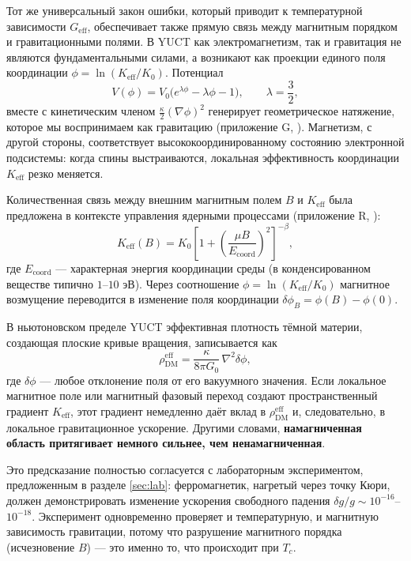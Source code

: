 \documentclass[12pt]{article}
\theoremstyle{remark}
\newcommand{\Keff}{K_{\mathrm{eff}}}
\begin{document}
	Тот же универсальный закон ошибки, который приводит к температурной зависимости $G_{\mathrm{eff}}$, обеспечивает также прямую связь между магнитным порядком и гравитационными полями. В YUCT как электромагнетизм, так и гравитация не являются фундаментальными силами, а возникают как проекции единого поля координации $\phi = \ln(\Keff/K_0)$. Потенциал
	\begin{equation}
		V(\phi) = V_0\bigl(e^{\lambda\phi} - \lambda\phi - 1\bigr), \qquad \lambda = \frac{3}{2},
	\end{equation}
	вместе с кинетическим членом $\frac{\kappa}{2}(\nabla\phi)^2$ генерирует геометрическое натяжение, которое мы воспринимаем как гравитацию (приложение G, \cite{AppendixG}). Магнетизм, с другой стороны, соответствует высококоординированному состоянию электронной подсистемы: когда спины выстраиваются, локальная эффективность координации $\Keff$ резко меняется.
	
	Количественная связь между внешним магнитным полем $B$ и $\Keff$ была предложена в контексте управления ядерными процессами (приложение R, \cite{AppendixR}):
	\begin{equation}
		\Keff(B) = K_0 \left[ 1 + \left( \frac{\mu B}{E_{\mathrm{coord}}} \right)^2 \right]^{-\beta},
		\label{eq:keff-B}
	\end{equation}
	где $E_{\mathrm{coord}}$ — характерная энергия координации среды (в конденсированном веществе типично $1$--$10$ эВ). Через соотношение $\phi = \ln(\Keff/K_0)$ магнитное возмущение переводится в изменение поля координации $\delta\phi_B = \phi(B) - \phi(0)$.
	
	В ньютоновском пределе YUCT эффективная плотность тёмной материи, создающая плоские кривые вращения, записывается как
	\begin{equation}
		\rho_{\mathrm{DM}}^{\mathrm{eff}} = \frac{\kappa}{8\pi G_0}\,\nabla^2\delta\phi,
		\label{eq:rho-dm}
	\end{equation}
	где $\delta\phi$ — любое отклонение поля от его вакуумного значения. Если локальное магнитное поле или магнитный фазовый переход создают пространственный градиент $\Keff$, этот градиент немедленно даёт вклад в $\rho_{\mathrm{DM}}^{\mathrm{eff}}$ и, следовательно, в локальное гравитационное ускорение. Другими словами, \textbf{намагниченная область притягивает немного сильнее, чем ненамагниченная}.
	
	Это предсказание полностью согласуется с лабораторным экспериментом, предложенным в разделе \ref{sec:lab}: ферромагнетик, нагретый через точку Кюри, должен демонстрировать изменение ускорения свободного падения $\delta g/g \sim 10^{-16}$–$10^{-18}$. Эксперимент одновременно проверяет и температурную, и магнитную зависимость гравитации, потому что разрушение магнитного порядка (исчезновение $B$) — это именно то, что происходит при $T_c$.
	
\end{document}
